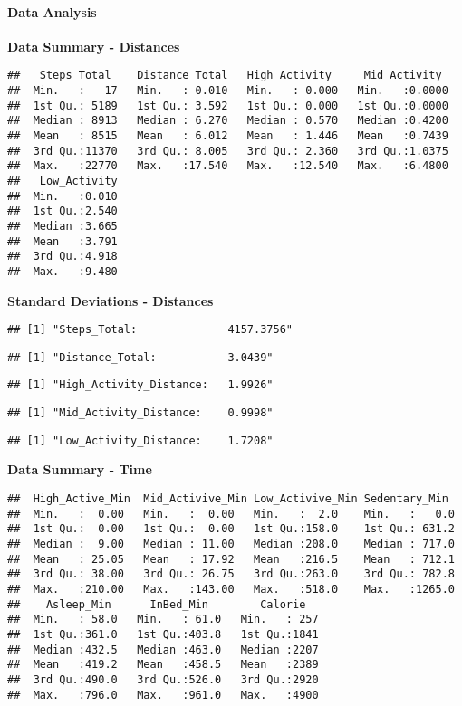 \documentclass[
]{article}
\begin{document}
\paragraph{\texorpdfstring{\textbf{Data
Analysis}}{Data Analysis}}\label{data-analysis}

\textbf{Data Summary - Distances}

\begin{verbatim}
##   Steps_Total    Distance_Total   High_Activity     Mid_Activity   
##  Min.   :   17   Min.   : 0.010   Min.   : 0.000   Min.   :0.0000  
##  1st Qu.: 5189   1st Qu.: 3.592   1st Qu.: 0.000   1st Qu.:0.0000  
##  Median : 8913   Median : 6.270   Median : 0.570   Median :0.4200  
##  Mean   : 8515   Mean   : 6.012   Mean   : 1.446   Mean   :0.7439  
##  3rd Qu.:11370   3rd Qu.: 8.005   3rd Qu.: 2.360   3rd Qu.:1.0375  
##  Max.   :22770   Max.   :17.540   Max.   :12.540   Max.   :6.4800  
##   Low_Activity  
##  Min.   :0.010  
##  1st Qu.:2.540  
##  Median :3.665  
##  Mean   :3.791  
##  3rd Qu.:4.918  
##  Max.   :9.480
\end{verbatim}

\textbf{Standard Deviations - Distances}

\begin{verbatim}
## [1] "Steps_Total:              4157.3756"
\end{verbatim}

\begin{verbatim}
## [1] "Distance_Total:           3.0439"
\end{verbatim}

\begin{verbatim}
## [1] "High_Activity_Distance:   1.9926"
\end{verbatim}

\begin{verbatim}
## [1] "Mid_Activity_Distance:    0.9998"
\end{verbatim}

\begin{verbatim}
## [1] "Low_Activity_Distance:    1.7208"
\end{verbatim}

\textbf{Data Summary - Time}

\begin{verbatim}
##  High_Active_Min  Mid_Activive_Min Low_Activive_Min Sedentary_Min   
##  Min.   :  0.00   Min.   :  0.00   Min.   :  2.0    Min.   :   0.0  
##  1st Qu.:  0.00   1st Qu.:  0.00   1st Qu.:158.0    1st Qu.: 631.2  
##  Median :  9.00   Median : 11.00   Median :208.0    Median : 717.0  
##  Mean   : 25.05   Mean   : 17.92   Mean   :216.5    Mean   : 712.1  
##  3rd Qu.: 38.00   3rd Qu.: 26.75   3rd Qu.:263.0    3rd Qu.: 782.8  
##  Max.   :210.00   Max.   :143.00   Max.   :518.0    Max.   :1265.0  
##    Asleep_Min      InBed_Min        Calorie    
##  Min.   : 58.0   Min.   : 61.0   Min.   : 257  
##  1st Qu.:361.0   1st Qu.:403.8   1st Qu.:1841  
##  Median :432.5   Median :463.0   Median :2207  
##  Mean   :419.2   Mean   :458.5   Mean   :2389  
##  3rd Qu.:490.0   3rd Qu.:526.0   3rd Qu.:2920  
##  Max.   :796.0   Max.   :961.0   Max.   :4900
\end{verbatim}
\end{document}
